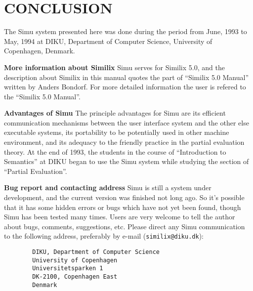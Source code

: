 \begin{sloppypar}
\section{CONCLUSION}

The Simu system presented here was done during the period from June,
1993 to May, 1994 at DIKU, Department of Computer Science, University
of Copenhagen, Denmark.

{\bf More information about Similix} Simu serves for Similix 5.0, and
the description about Similix in this manual quotes the part of
``Similix 5.0 Manual'' \cite{Bondorf:93:manual} written by Anders
Bondorf. For more detailed information the user is refered to the
``Similix 5.0 Manual''.

{\bf Advantages of Simu} The principle advantages for Simu are its
efficient communication mechanisms between the user interface system
and the other else executable systems, its portability to be
potentially used in other machine environment, and its adequacy to the
friendly practice in the partial evaluation theory.  At the end of
1993, the students in the course of ``Introduction to Semantics'' at
DIKU began to use the Simu system while studying the section of
``Partial Evaluation''.

{\bf Bug report and contacting address} Simu is still a system under
development, and the current version was finished not long ago. So
it's possible that it has some hidden errors or bugs which have not
yet been found, though Simu has been tested many times. Users are very
welcome to tell the author about bugs, comments, suggestions,
etc. Please direct any Simu communication to the following address,
preferably by e-mail ({\tt similix@diku.dk}):

\begin{verbatim}
        DIKU, Department of Computer Science
        University of Copenhagen
        Universitetsparken 1
        DK-2100, Copenhagen East
        Denmark
\end{verbatim}

\pagebreak





\end{sloppypar}


